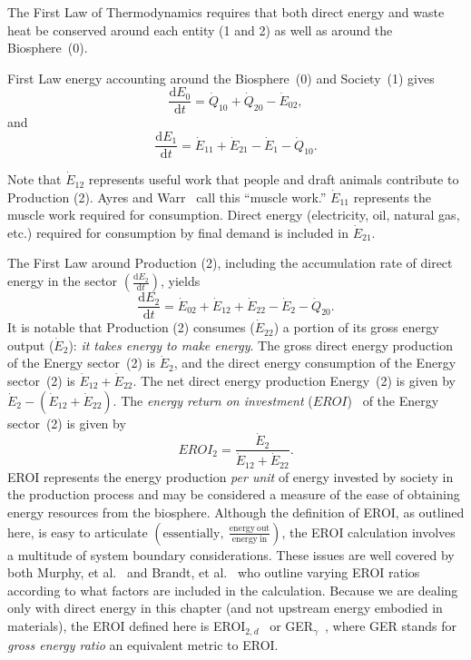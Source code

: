 The First Law of Thermodynamics
requires that both 
direct energy and 
waste heat
be conserved around each 
entity (1 and 2) as well as around the Biosphere~(0).

\noindent{}First Law energy accounting around the Biosphere~(0) and Society~(1) gives
%
\begin{equation} \label{eq:CV_E_dot_0}
	\frac{\mathrm{d}E_{0}}{\mathrm{d}t} 	 
	= \dot{Q}_{10} 
	+ \dot{Q}_{20} 
	- \dot{E}_{02},
\end{equation}
%
and 
%
\begin{equation} \label{eq:CV_E_dot_1}
	\frac{\mathrm{d}E_{1}}{\mathrm{d}t} 	 
	= \dot{E}_{11} 
	+ \dot{E}_{21}
	- \dot{E}_{1}
	- \dot{Q}_{10}.
\end{equation}

Note that $\dot{E}_{12}$ represents useful work that people
and draft animals contribute to Production (2). 
Ayres and Warr~\cite{Ayres:2003ec,Warr:2012cg} call this ``muscle work.'' 
$\dot{E}_{11}$ represents the muscle work required for consumption. 
Direct energy (electricity, oil, natural gas, etc.) 
required for consumption by final demand 
is included in $\dot{E}_{21}$.

The First Law around Production (2), 
including the accumulation rate of direct energy in the sector 
$\left(\frac{\mathrm{d}E_{2}}{\mathrm{d}t}\right)$, yields
%
\begin{equation} \label{eq:CV_E_dot_2}
	\frac{\mathrm{d}E_{2}}{\mathrm{d}t} 
	= \dot{E}_{02} 
	+ \dot{E}_{12}
	+ \dot{E}_{22} 
	- \dot{E}_{2} 
	- \dot{Q}_{20}.
\end{equation}
%
It is notable that Production (2) consumes ($\dot{E}_{22}$)
a portion of its gross energy output ($\dot{E}_2$): \emph{it takes energy to make energy}.
The gross direct energy production of the Energy sector~(2) is 
$\dot{E}_{2}$, and the direct energy consumption of the Energy sector~(2) is 
$\dot{E}_{12} + \dot{E}_{22}$. 
The net direct energy production Energy~(2)
is given by $\dot{E}_{2} - (\dot{E}_{12} + \dot{E}_{22})$.
The \emph{energy return on investment}
($EROI$)~\cite{Smith1960, Hall1986} of the Energy sector~(2) is given by
%
\begin{equation} \label{eq:C-EROI}
	EROI_{2} 
	= \frac{\dot{E}_{2}}{\dot{E}_{12} + \dot{E}_{22}}.
\end{equation}
%
EROI represents the energy production \emph{per unit} of energy
invested by society in the production process and may
be considered a measure of the ease of obtaining
energy resources from the biosphere.
Although the definition of EROI, as outlined here, 
is easy to articulate 
$\left( \mathrm{essentially,} \: \frac{\mathrm{energy~out}}{\mathrm{energy~in}} \right)$,
the EROI calculation involves a multitude of system boundary considerations.
These issues are well covered by both Murphy, et al.~\cite{Murphy2011}
and Brandt, et al.~\cite{Brandt2011a, Brandt2013} who outline varying
EROI	ratios according to what factors are included in the calculation.
Because we are dealing only with direct energy in this chapter
(and not upstream energy embodied in materials),
the EROI defined here is EROI$_{2,d}$~\cite[Table~1]{Murphy2011}
or GER$_{\gamma}$~\cite[Table~1]{Brandt2011},
where GER stands for \emph{gross energy ratio}
an equivalent metric to EROI\@.

